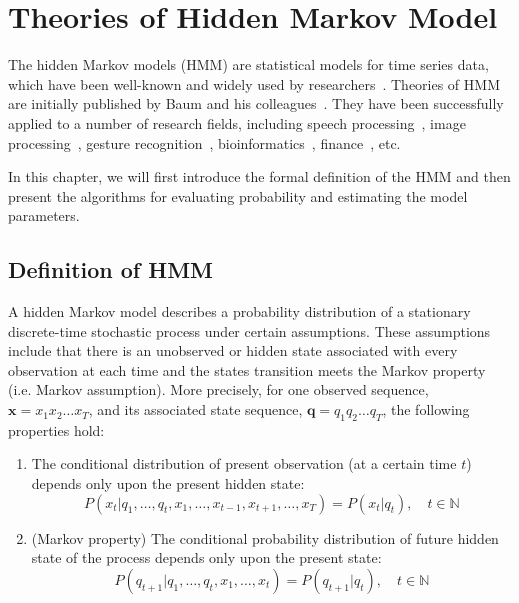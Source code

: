 \documentclass[12pt,final,twoside]{report}
\begin{document}
\cleardoublepage
\chapter{Theories of Hidden Markov Model}
\label{ch:hmm}
The hidden Markov models (HMM) are statistical models for time series data, which have been well-known and widely used by researchers~\cite{rabiner_tutorial_1989, rabiner_fundamentals_1993}. Theories of HMM are initially published by Baum and his colleagues~\cite{baum_statistical_1966, baum_maximization_1970}. They have been successfully applied to a number of research fields, including speech processing~\cite{baker_dragon_1975, rabiner_fundamentals_1993}, image processing~\cite{chen_off-line_1994}, gesture recognition~\cite{mitra_gesture_2007}, bioinformatics~\cite{koski_hidden_2001}, finance~\cite{bhar_hidden_2004}, etc.

In this chapter, we will first introduce the formal definition of the HMM and then present the algorithms for evaluating probability and estimating the model parameters.

\section{Definition of HMM} \label{sec:hmm}
A hidden Markov model describes a probability distribution of a stationary discrete-time stochastic process under certain assumptions. These assumptions include that there is an unobserved or hidden state associated with every observation at each time and the states transition meets the Markov property (i.e. Markov assumption). More precisely, for one observed sequence, $\mathbf{x} = x_1 x_2 \dots x_T$, and its associated state sequence, $\mathbf{q} = q_1 q_2 \dots q_T$, the following properties hold:

\begin{enumerate}
  \item The conditional distribution of present observation (at a certain time $t$) depends only upon the present hidden state:
    \begin{equation}
      P(x_t|q_1, \dots, q_t, x_1, \dots, x_{t-1},x_{t+1},\dots,x_T) = P(x_t|q_t), \quad t \in \mathbb{N} 
      \label{eq:ob_prob}
    \end{equation}
  \item (Markov property) The conditional probability distribution of future hidden state of the process depends only upon the present state:
    \begin{equation}
      P(q_{t+1}|q_1, \dots, q_t, x_1, \dots, x_t) = P(q_{t+1}|q_t),\quad t \in \mathbb{N}
      \label{eq:markov_prop}
    \end{equation}
\end{enumerate}
\end{document}
